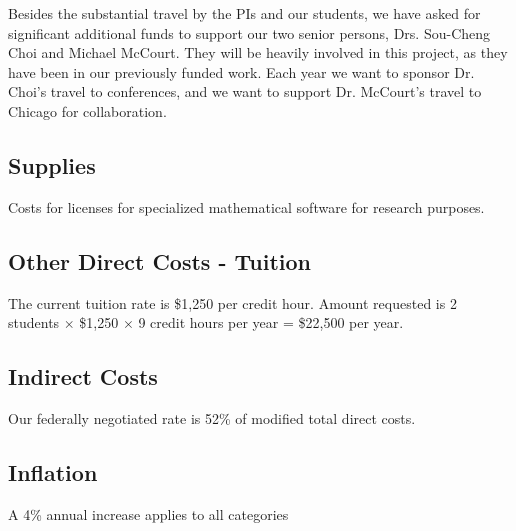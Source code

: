 \documentclass[11pt]{NSFamsart}
\begin{document}
Besides the substantial travel by the PIs and our students, we have asked for significant additional funds to support our two senior persons, Drs. Sou-Cheng Choi and Michael McCourt.  They will be heavily involved in this project, as they have been in our previously funded work.  Each year we want to sponsor Dr. Choi's travel to conferences, and we want to support Dr. McCourt's travel to Chicago for collaboration.

\subsection*{Supplies}
Costs for licenses for specialized mathematical software for research purposes.

\subsection*{Other Direct Costs - Tuition}
The current tuition rate is \$1,250 per credit hour. Amount requested is 2 students $\times$
\$1,250 $\times$ 9 credit hours per year = \$22,500 per year.

\subsection*{Indirect Costs}
Our federally negotiated rate is 52\% of modified total direct costs.

\subsection*{Inflation}A 4\% annual increase applies to all categories
\end{document}
